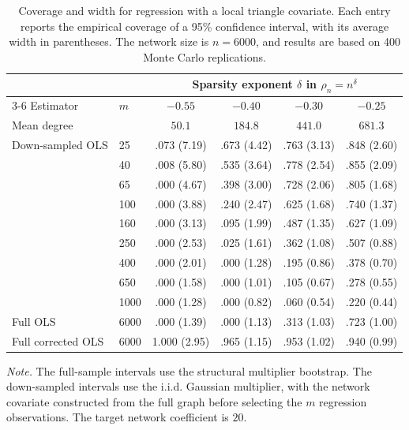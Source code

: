 \begin{table}[t]
\centering
\caption{Coverage and width for regression with a local triangle covariate. Each entry reports the empirical coverage of a 95\% confidence interval, with its average width in parentheses. The network size is $n=6000$, and results are based on 400 Monte Carlo replications.}
\label{tab:triangle-downsampling-coverage-width}
\small
\setlength{\tabcolsep}{5pt}
\begin{tabular}{llcccc}
\toprule
&& \multicolumn{4}{c}{Sparsity exponent $\delta$ in $\rho_n=n^\delta$} \\
\cmidrule(lr){3-6}
Estimator & $m$ & $-0.55$ & $-0.40$ & $-0.30$ & $-0.25$ \\
Mean degree && $50.1$ & $184.8$ & $441.0$ & $681.3$ \\
\midrule
Down-sampled OLS & 25   & .073 (7.19) & .673 (4.42) & .763 (3.13) & .848 (2.60) \\
                 & 40   & .008 (5.80) & .535 (3.64) & .778 (2.54) & .855 (2.09) \\
                 & 65   & .000 (4.67) & .398 (3.00) & .728 (2.06) & .805 (1.68) \\
                 & 100  & .000 (3.88) & .240 (2.47) & .625 (1.68) & .740 (1.37) \\
                 & 160  & .000 (3.13) & .095 (1.99) & .487 (1.35) & .627 (1.09) \\
                 & 250  & .000 (2.53) & .025 (1.61) & .362 (1.08) & .507 (0.88) \\
                 & 400  & .000 (2.01) & .000 (1.28) & .195 (0.86) & .378 (0.70) \\
                 & 650  & .000 (1.58) & .000 (1.01) & .105 (0.67) & .278 (0.55) \\
                 & 1000 & .000 (1.28) & .000 (0.82) & .060 (0.54) & .220 (0.44) \\
\midrule
Full OLS           & 6000 & .000 (1.39) & .000 (1.13) & .313 (1.03) & .723 (1.00) \\
Full corrected OLS & 6000 & 1.000 (2.95) & .965 (1.15) & .953 (1.02) & .940 (0.99) \\
\bottomrule
\end{tabular}
\begin{minipage}{0.96\linewidth}
\footnotesize\vspace{2pt}
\textit{Note.} The full-sample intervals use the structural multiplier bootstrap. The down-sampled intervals use the i.i.d. Gaussian multiplier, with the network covariate constructed from the full graph before selecting the $m$ regression observations. The target network coefficient is $20$.
\end{minipage}
\end{table}
